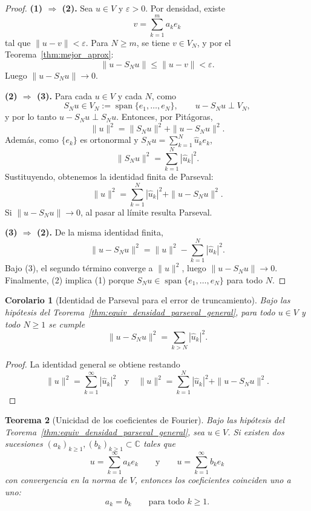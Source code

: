 \documentclass[a4paper,11pt]{report}
\newtheorem{theorem}{Teorema}[chapter]
\newtheorem{corollary}[theorem]{Corolario}
\begin{document}
\begin{proof}
\textbf{(1) $\Rightarrow$ (2).} Sea $u\in V$ y $\varepsilon>0$. Por densidad, existe
\[
v=\sum_{k=1}^m a_ke_k
\]
tal que $\|u-v\|<\varepsilon$. Para $N\ge m$, se tiene $v\in V_N$, y por el Teorema~\ref{thm:mejor_aprox}:
\[
\|u-S_Nu\|\le \|u-v\|<\varepsilon.
\]
Luego $\|u-S_Nu\|\to 0$.

\textbf{(2) $\Rightarrow$ (3).} Para cada $u\in V$ y cada $N$, como
\[
S_Nu\in V_N:=\operatorname{span}\{e_1,\dots,e_N\},\qquad u-S_Nu\perp V_N,
\]
y por lo tanto $u-S_Nu\perp S_Nu$. Entonces, por Pit\'agoras,
\[
\|u\|^2=\|S_Nu\|^2+\|u-S_Nu\|^2.
\]
Adem\'as, como $\{e_k\}$ es ortonormal y $S_Nu=\sum_{k=1}^N\widehat u_k e_k$,
\[
\|S_Nu\|^2=\sum_{k=1}^N|\widehat u_k|^2.
\]
Sustituyendo, obtenemos la identidad finita de Parseval:
\[
\|u\|^2=\sum_{k=1}^N|\widehat u_k|^2+\|u-S_Nu\|^2.
\]
Si $\|u-S_Nu\|\to0$, al pasar al límite resulta Parseval.

\textbf{(3) $\Rightarrow$ (2).} De la misma identidad finita,
\[
\|u-S_Nu\|^2 = \|u\|^2-\sum_{k=1}^N|\widehat u_k|^2.
\]
Bajo (3), el segundo término converge a $\|u\|^2$, luego $\|u-S_Nu\|\to0$.
Finalmente, (2) implica (1) porque $S_Nu\in\operatorname{span}\{e_1,\dots,e_N\}$ para todo $N$.
\end{proof}

\begin{corollary}[Identidad de Parseval para el error de truncamiento]\label{cor:parseval_error_truncamiento}
Bajo las hipótesis del Teorema~\ref{thm:equiv_densidad_parseval_general}, para todo $u\in V$ y todo $N\ge1$ se cumple
\[
\|u-S_Nu\|^2=\sum_{k>N}|\widehat u_k|^2.
\]
\end{corollary}

\begin{proof}
La identidad general se obtiene restando
\[
\|u\|^2=\sum_{k=1}^{\infty}|\widehat u_k|^2
\quad\text{y}\quad
\|u\|^2=\sum_{k=1}^{N}|\widehat u_k|^2+\|u-S_Nu\|^2.
\]
\end{proof}

\begin{theorem}[Unicidad de los coeficientes de Fourier]\label{thm:unicidad_coeficientes_fourier}
Bajo las hipótesis del Teorema~\ref{thm:equiv_densidad_parseval_general}, sea $u\in V$. Si existen dos sucesiones $(a_k)_{k\ge1},(b_k)_{k\ge1}\subset\mathbb C$ tales que
\[
u=\sum_{k=1}^{\infty} a_k e_k
\qquad\text{y}\qquad
u=\sum_{k=1}^{\infty} b_k e_k
\]
con convergencia en la norma de $V$, entonces los coeficientes coinciden uno a uno:
\[
a_k=b_k\qquad\text{para todo }k\ge1.
\]
\end{theorem}
\end{document}
